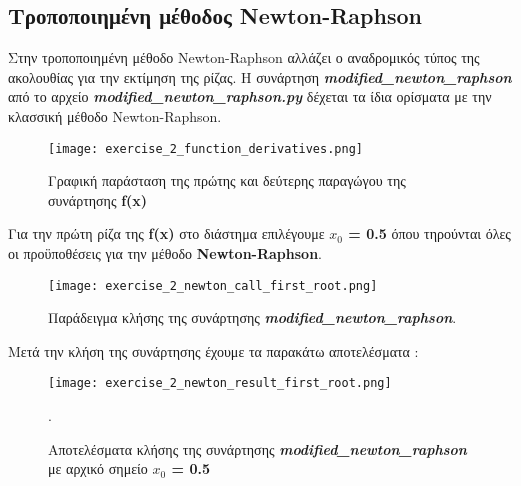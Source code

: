 \documentclass[First Project.tex]{subfiles}
\begin{document}
\subsection{ Τροποποιημένη μέθοδος \textlatin{Newton-Raphson} }

Στην τροποποιημένη μέθοδο \textlatin{Newton-Raphson} αλλάζει ο αναδρομικός τύπος της ακολουθίας για την εκτίμηση της ρίζας. Η συνάρτηση 
\textit{\textlatin{\textbf{modified\_newton\_raphson}}} από το αρχείο \textit{\textlatin{\textbf{modified\_newton\_raphson.py}}} δέχεται τα 
ίδια ορίσματα με την κλασσική μέθοδο \textlatin{Newton-Raphson}.
\begin{figure}[h!]
    \centering
    \captionsetup{justification=centering}
    \begin{center}
        \texttt{[image: exercise\_2\_function\_derivatives.png]}    
        \caption{Γραφική παράσταση της πρώτης και δεύτερης παραγώγου της συνάρτησης \textlatin{\textbf{f(x)}}}
    \end{center}
\end{figure}

Για την πρώτη ρίζα της \textlatin{\textbf{f(x)}} στο διάστημα επιλέγουμε \textlatin{\textbf{ $x_{0}$ = 0.5}} όπου τηρούνται όλες οι προϋποθέσεις
για την μέθοδο \textlatin{\textbf{Newton-Raphson}}. 
\begin{figure}[h!]
    \centering
    \captionsetup{justification=centering}
    \begin{center}
        \texttt{[image: exercise\_2\_newton\_call\_first\_root.png]}    
        \caption{Παράδειγμα κλήσης της συνάρτησης \textit{\textlatin{\textbf{modified\_newton\_raphson}}}.}
    \end{center}
\end{figure}
Μετά την κλήση της συνάρτησης έχουμε τα παρακάτω αποτελέσματα :
\begin{figure}[h!]
    \centering
    \captionsetup{justification=centering}
    \begin{center}
    \texttt{[image: exercise\_2\_newton\_result\_first\_root.png]}    
    \caption{ Αποτελέσματα κλήσης της συνάρτησης \textit{\textlatin{\textbf{modified\_newton\_raphson}}} \\ με αρχικό σημείο 
                \textlatin{\textbf{$x_{0}$ = 0.5}}}.
    \end{center}
\end{figure}
\end{document}

